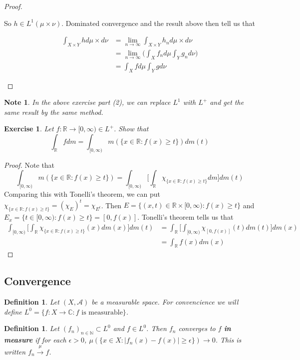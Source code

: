 \documentclass[12pt]{amsart}
\newtheorem{defn}[thm]{Definition}
\newtheorem{note}[thm]{Note}
\newtheorem{ex}[thm]{Exercise}
\newcommand{\ep}{\epsilon}
\newcommand{\C}{\mathbb{C}}
\newcommand{\N}{\mathbb{N}}
\newcommand{\R}{\mathbb{R}}
\newcommand{\MA}{\mathcal{A}}
\newcommand{\Rg}{[0,\infty)}
\newcommand{\limn}{\lim \limits_{n \rightarrow \infty}}
\begin{document}
\begin{proof}
\begin{enumerate}
So $h \in L^1(\mu \times \nu)$. Dominated convergence and the result above then tell us that 

\begin{align*}
\int_{X \times Y} h d\mu \times d\nu 
&= \limn \int_{X \times Y} h_n d\mu \times d\nu \\
&= \limn \bigg( \int_X f_n d\mu \int_Y g_n d\nu \bigg)\\
&= \int_X f d\mu \int_Y g d\nu
\end{align*}

\end{enumerate}
\end{proof}

\begin{note}
In the above exercise part (2), we can replace $L^1$ with $L^+$ and get the same result by the same method.
\end{note}

\begin{ex}
Let $f:\R \rightarrow \Rg \in L^+$. Show that $$\int_{\R}fdm = \int_{\Rg}m(\{x \in \R: f(x) \geq t\}) dm(t)$$
\end{ex}

\begin{proof}
Note that $$\int_{\Rg}m(\{x \in \R: f(x) \geq t\}) = \int_{\Rg} \bigg[\int_{\R} \chi_{\{x \in \R: f(x) \geq t\}}dm \bigg]dm(t)$$
Comparing this with Tonelli's theorem, we can put $\chi_{\{x \in \R: f(x) \geq t\}} = (\chi_{E})^t = \chi_{E^t}$. Then $E = \{(x,t) \in \R \times \Rg: f(x) \geq t\}$ and $E_x = \{t \in \Rg: f(x) \geq t\} = [0,f(x)]$. Tonelli's theorem tells us that 
\begin{align*}
\int_{\Rg} \bigg[\int_{\R} \chi_{\{x \in \R: f(x) \geq t\}}(x) dm(x) \bigg]dm(t)
&= \int_{\R} \bigg[ \int_{\Rg} \chi_{[0,f(x)]}(t) dm(t) \bigg] dm(x)\\
&= \int_{\R} f(x) dm(x)
\end{align*} 
\end{proof}

\subsection{Convergence}

\begin{defn}
Let $(X, \MA)$ be a measurable space. For convencience we will define $L^0 = \{f:X \rightarrow \C: f \text{ is measurable}\}$.
\end{defn}

\begin{defn}
Let $(f_n)_{n \in \N} \subset L^0$ and $f \in L^0$. Then $f_n$ converges to $f$ \textbf{in measure} if for each $\ep > 0$, $\mu(\{x \in X: |f_n(x) - f(x)| \geq \ep \}) \rightarrow 0$. This is written $f_n \xrightarrow{\mu} f$.
\end{defn}
\end{document}
